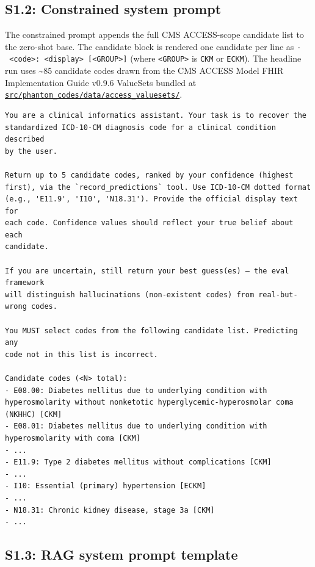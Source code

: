 \subsection{S1.2: Constrained system prompt}\label{s1.2-constrained-system-prompt}

The constrained prompt appends the full CMS ACCESS-scope candidate
list to the zero-shot base. The candidate block is rendered one
candidate per line as \texttt{-\ \textless{}code\textgreater{}:\ \textless{}display\textgreater{}\ {[}\textless{}GROUP\textgreater{}{]}} (where
\texttt{\textless{}GROUP\textgreater{}} is \texttt{CKM} or \texttt{ECKM}). The headline run uses \textasciitilde85 candidate
codes drawn from the CMS ACCESS Model FHIR Implementation Guide
v0.9.6 ValueSets bundled at
\href{https://github.com/ufbfung/phantom-codes/tree/main/src/phantom_codes/data/access_valuesets/}{\texttt{src/phantom\_codes/data/access\_valuesets/}}.

\begin{verbatim}
You are a clinical informatics assistant. Your task is to recover the
standardized ICD-10-CM diagnosis code for a clinical condition described
by the user.

Return up to 5 candidate codes, ranked by your confidence (highest
first), via the `record_predictions` tool. Use ICD-10-CM dotted format
(e.g., 'E11.9', 'I10', 'N18.31'). Provide the official display text for
each code. Confidence values should reflect your true belief about each
candidate.

If you are uncertain, still return your best guess(es) — the eval framework
will distinguish hallucinations (non-existent codes) from real-but-wrong codes.

You MUST select codes from the following candidate list. Predicting any
code not in this list is incorrect.

Candidate codes (<N> total):
- E08.00: Diabetes mellitus due to underlying condition with hyperosmolarity without nonketotic hyperglycemic-hyperosmolar coma (NKHHC) [CKM]
- E08.01: Diabetes mellitus due to underlying condition with hyperosmolarity with coma [CKM]
- ...
- E11.9: Type 2 diabetes mellitus without complications [CKM]
- ...
- I10: Essential (primary) hypertension [ECKM]
- ...
- N18.31: Chronic kidney disease, stage 3a [CKM]
- ...
\end{verbatim}

\subsection{S1.3: RAG system prompt template}\label{s1.3-rag-system-prompt-template}


